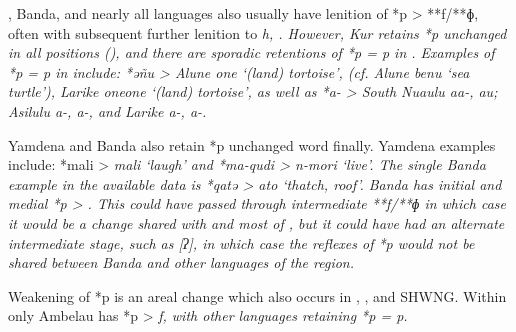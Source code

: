 , Banda, and nearly all 
languages also usually have lenition of *p > **f/**ɸ,
often with subsequent further lenition to \it{h, {\0}}.
However, Kur retains *p unchanged in all positions (),
and there are sporadic retentions of *p = \it{p} in .
Examples of *p = \it{p} in  include: *əñu > Alune
\it{one} ‘(land) tortoise’, (cf.
Alune \it{benu} ‘sea turtle’),
Larike \it{one{\tl}one} ‘(land) tortoise’,
as well as *a-  > South Nuaulu \it{aa-,
au}; Asilulu \it{a-, a-},
and Larike \it{a-, a-}.

Yamdena and Banda also retain *p unchanged word finally.
Yamdena examples include: *mali > \it{mali} ‘laugh’
and *ma-qudi > \it{n-mori} ‘live’. The single
Banda example in the available data is *qatə > \it{ato} ‘thatch, roof’.
Banda has initial and medial *p > {\0}.
This could have passed through intermediate **f/**ɸ in which
case it would be a change shared with 
and most of ,
but it could have had an alternate intermediate stage,
such as [ʔ], in which case the reflexes of *p would not be shared
between Banda and other languages of the region.

Weakening of *p is an areal change which also occurs
in , , and SHWNG.
Within  only Ambelau has *p > \it{f},
with other  languages retaining *p = \it{p}.

